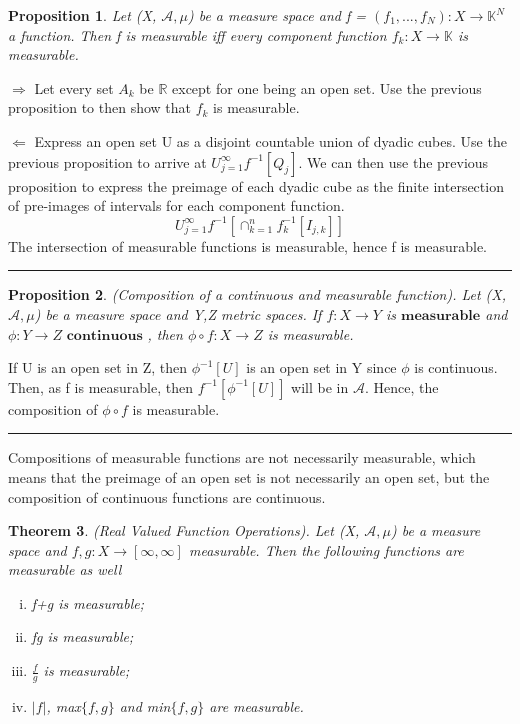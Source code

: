 \documentclass[twoside]{article}
\newcounter{lecnum}
\newtheorem{theorem}{Theorem}[lecnum]
\newtheorem{proposition}[theorem]{Proposition}
\newenvironment{proof}{{\bf Proof:}}{\hfill\rule{2mm}{2mm}}
\begin{document}
\begin{proposition}
Let (X, $\mathcal{A}, \mu$) be a measure space and f = $(f_1,...,f_N): X \rightarrow \mathbb{K}^N$ a function. Then f is measurable iff every component function $f_k: X \rightarrow \mathbb{K}$ is measurable.
\end{proposition}

\begin{proof}
$\Longrightarrow$
Let every set $A_k$ be $\mathbb{R}$ except for one being an open set. Use the previous proposition to then show that $f_k$ is measurable.

$\Longleftarrow$
Express an open set U as a disjoint countable union of dyadic cubes. Use the previous proposition to arrive at $U_{j=1}^{\infty}f^{-1}[Q_j].$ We can then use the previous proposition to express the preimage of each dyadic cube as the finite intersection of pre-images of intervals for each component function.
$$
U_{j=1}^{\infty}f^{-1}[\cap_{k=1}^{n}f_k^{-1}[I_{j,k}]]
$$
The intersection of measurable functions is measurable, hence f is measurable.

\end{proof}

\begin{proposition}
(Composition of a continuous and measurable function). Let (X, $\mathcal{A}, \mu$) be a measure space and Y,Z metric spaces. If $f: X \rightarrow Y$ is $\textbf{measurable}$ and $\phi: Y \rightarrow Z \textbf{ continuous }$, then $\phi \circ f: X \rightarrow Z$ is measurable.
\end{proposition}

\begin{proof}
If U is an open set in Z, then $\phi^{-1}[U]$ is an open set in Y since $\phi$ is continuous. Then, as f is measurable, then $f^{-1}[\phi^{-1}[U]]$ will be in $\mathcal{A}$. Hence, the composition of $\phi \circ f$ is measurable.
\end{proof}

Compositions of measurable functions are not necessarily measurable, which means that the preimage of an open set is not necessarily an open set, but the composition of continuous functions are continuous.

\begin{theorem}
(Real Valued Function Operations). Let (X, $\mathcal{A}, \mu$) be a measure space and $f,g: X \rightarrow [\infty, \infty]$ measurable. Then the following functions are measurable as well
\begin{enumerate}[(i)]
    \item f+g is measurable;
    \item fg is measurable;
    \item $\frac{f}{g}$ is measurable;
    \item $|f|$, max$\{f,g\}$ and min$\{f,g\}$ are measurable.
\end{enumerate}
\end{theorem}
\end{document}
